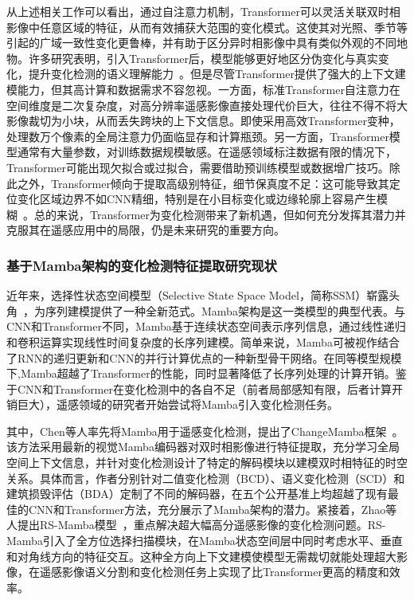 从上述相关工作可以看出，通过自注意力机制，Transformer可以灵活关联双时相影像中任意区域的特征，从而有效捕获大范围的变化模式。这使其对光照、季节等引起的广域一致性变化更鲁棒，并有助于区分异时相影像中具有类似外观的不同地物。许多研究表明，引入Transformer后，模型能够更好地区分伪变化与真实变化，提升变化检测的语义理解能力~\cite{Li2022TransUNetCDAH}。但是尽管Transformer提供了强大的上下文建模能力，但其高计算和数据需求不容忽视。一方面，标准Transformer自注意力在空间维度是二次复杂度，对高分辨率遥感影像直接处理代价巨大，往往不得不将大影像裁切为小块，从而丢失跨块的上下文信息。即使采用高效Transformer变种，处理数万个像素的全局注意力仍面临显存和计算瓶颈。另一方面，Transformer模型通常有大量参数，对训练数据规模敏感。在遥感领域标注数据有限的情况下，Transformer可能出现欠拟合或过拟合，需要借助预训练模型或数据增广技巧。除此之外，Transformer倾向于提取高级别特征，细节保真度不足：这可能导致其定位变化区域边界不如CNN精细，特别是在小目标变化或边缘轮廓上容易产生模糊~\cite{Deng2023TChangeAH}。总的来说，Transformer为变化检测带来了新机遇，但如何充分发挥其潜力并克服其在遥感应用中的局限，仍是未来研究的重要方向。

\subsubsection{基于Mamba架构的变化检测特征提取研究现状}

近年来，选择性状态空间模型（Selective State Space Model，简称SSM）崭露头角~\cite{Gu2023MambaLS}，为序列建模提供了一种全新范式。Mamba架构是这一类模型的典型代表。与CNN和Transformer不同，Mamba基于连续状态空间表示序列信息，通过线性递归和卷积运算实现线性时间复杂度的长序列建模。简单来说，Mamba可被视作结合了RNN的递归更新和CNN的并行计算优点的一种新型骨干网络。在同等模型规模下,Mamba超越了Transformer的性能，同时显著降低了长序列处理的计算开销。鉴于CNN和Transformer在变化检测中的各自不足（前者局部感知有限，后者计算开销巨大），遥感领域的研究者开始尝试将Mamba引入变化检测任务。

其中，Chen等人率先将Mamba用于遥感变化检测，提出了ChangeMamba框架~\cite{chen2024changemamba}。该方法采用最新的视觉Mamba编码器对双时相影像进行特征提取，充分学习全局空间上下文信息，并针对变化检测设计了特定的解码模块以建模双时相特征的时空关系。具体而言，作者分别针对二值变化检测（BCD）、语义变化检测（SCD）和建筑损毁评估（BDA）定制了不同的解码器，在五个公开基准上均超越了现有最佳的CNN和Transformer方法，充分展示了Mamba架构的潜力。紧接着，Zhao等人提出RS-Mamba模型~\cite{zhao_rs-mamba_2024}，重点解决超大幅高分遥感影像的变化检测问题。RS-Mamba引入了全方位选择扫描模块，在Mamba状态空间层中同时考虑水平、垂直和对角线方向的特征交互。这种全方向上下文建模使模型无需裁切就能处理超大影像，在遥感影像语义分割和变化检测任务上实现了比Transformer更高的精度和效率。

